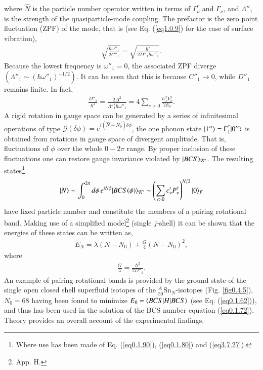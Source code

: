 where $\hat N$ is the particle number operator written in terms of $\Gamma^\dagger_\nu$ and $\Gamma_\nu$, and $\Lambda''_1$ is the strength of the quasiparticle-mode coupling. The prefactor is the zero point fluctuation (ZPF) of the mode, that is (see Eq. (\ref{eq1.0.9}) for the case of surface vibration),
\begin{align}\label{eq0.1.99}
\sqrt{\frac{\hbar\omega''_1}{2C''_1}}=\sqrt{\frac{\hbar^2}{2D''_1\hbar\omega''_1}}.
\end{align}
Because the lowest frequency is $\omega''_1=0$, the associated ZPF diverge $(\Lambda''_1\sim(\hbar\omega''_1)^{-1/2})$. It can be seen that this is because $C''_1\to0$, while $D''_1$ remains finite. In fact,
\begin{align}\label{eq0.1.100}
\frac{D''_1}{\hbar^2}=\frac{2\Delta^2}{\Lambda''^2_1\hbar\omega''_1}=4\sum_{\nu>0}\frac{U^2_\nu V^2_\nu}{2E_\nu}.
\end{align}
 A rigid rotation in gauge space can be generated by a series of infinitesimal operations of type $\mathcal G(\delta\phi)=e^{i(\hat N-N_0)\delta\phi}$, the one phonon state $|{1''} \rangle=\Gamma^\dagger_1|{0''} \rangle$ is obtained from rotations in gauge space of divergent amplitude. That is, fluctuations of $\phi$ over the whole $0-2\pi$ range. By proper inclusion of these fluctuations one can restore gauge invariance violated by $|{BCS} \rangle_{\mathcal K'}$. The resulting states\footnote{Where use has been made of Eq. (\ref{eq0.1.90}), (\ref{eq0.1.80}) and (\ref{eq3.7.27}).}
\begin{align}\label{eq0.1.101}
|{N} \rangle\sim\int^{2\pi}_0d\phi\,e^{iN\phi}|{BCS(\phi)} \rangle_{\mathcal K'}\sim\left(\sum_{\nu>0}c'_\nu P^\dagger_\nu\right)^{N/2}|{0} \rangle_F
\end{align}
have  fixed  particle number and constitute the members of a pairing rotational band. Making use of a simplified model\footnote{\cite{Brink:05} App. H.} (single $j$-shell) it can be shown that the energies of these states can be written as,
\begin{align}\label{eq0.1.102}
E_N=\lambda(N-N_0)+\frac{G}{4}\left(N-N_0\right)^2,
\end{align}
where 
\begin{align}\label{eq0.1.103}
\frac{G}{4}=\frac{\hbar^2}{2D''_1}.
\end{align}
An example of pairing rotational bands is provided by the ground state of the single open closed shell superfluid isotopes of the $^A_{50}$Sn$_N$-isotopes (Fig. \ref{fig0.4.5}), $N_0=68$ having been found to minimize $E_0=\langle {BCS|H|BCS} \rangle$ (see Eq. (\ref{eq0.1.62})), and thus has been used in the solution of the BCS number equation (\ref{eq0.1.72}). Theory provides an overall account of the experimental findings.

